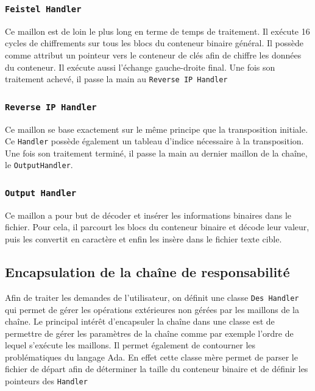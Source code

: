 \documentclass[a4paper]{article}
\begin{document}
\subsubsection{\texttt{Feistel Handler}}
Ce maillon est de loin le plus long en terme de temps de traitement. Il exécute 16 cycles de chiffrements sur tous les blocs du conteneur binaire général. Il possède comme attribut un pointeur vers le conteneur de clés afin de chiffre les données du conteneur. Il exécute aussi l'échange gauche-droite final. Une fois son traitement achevé, il passe la main au  \texttt{Reverse IP Handler}

\subsubsection{\texttt{Reverse IP Handler}}
Ce maillon se base exactement sur le même principe que la transposition initiale. Ce \texttt{Handler} possède également un tableau d'indice nécessaire à la transposition. Une fois son traitement terminé, il passe la main au dernier maillon de la chaîne, le \texttt{OutputHandler}.

\subsubsection{\texttt{Output Handler}}
Ce maillon a pour but de décoder et insérer les informations binaires dans le fichier. Pour cela, il parcourt les blocs du conteneur binaire et décode leur valeur, puis les convertit en caractère et enfin les insère dans le fichier texte cible.

\subsection{Encapsulation de la chaîne de responsabilité}
Afin de traiter les demandes de l'utilisateur, on définit une classe \texttt{Des Handler} qui permet de gérer les opérations extérieures non gérées par les maillons de la chaîne.
\smallbreak
Le principal intérêt d'encapsuler la chaîne dans une classe est de permettre de gérer les paramètres de la chaîne comme par exemple l'ordre de lequel s'exécute les maillons. Il permet également de contourner les problématiques du langage Ada. En effet cette classe mère permet de parser le fichier de départ afin de déterminer la taille du conteneur binaire et de définir les pointeurs des \texttt{Handler}
\end{document}
